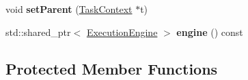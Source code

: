 \begin{DoxyCompactItemize}
\item 
\hypertarget{classcoco_1_1_task_context_ae13c894e4e1e4d615724f8b556722ade}{}void {\bfseries set\+Parent} (\hyperlink{classcoco_1_1_task_context}{Task\+Context} $\ast$t)\label{classcoco_1_1_task_context_ae13c894e4e1e4d615724f8b556722ade}

\item 
\hypertarget{classcoco_1_1_task_context_a7d7947be2c6466cbae938958bf147c5a}{}std\+::shared\+\_\+ptr$<$ \hyperlink{classcoco_1_1_execution_engine}{Execution\+Engine} $>$ {\bfseries engine} () const \label{classcoco_1_1_task_context_a7d7947be2c6466cbae938958bf147c5a}

\end{DoxyCompactItemize}
\subsection*{Protected Member Functions}
